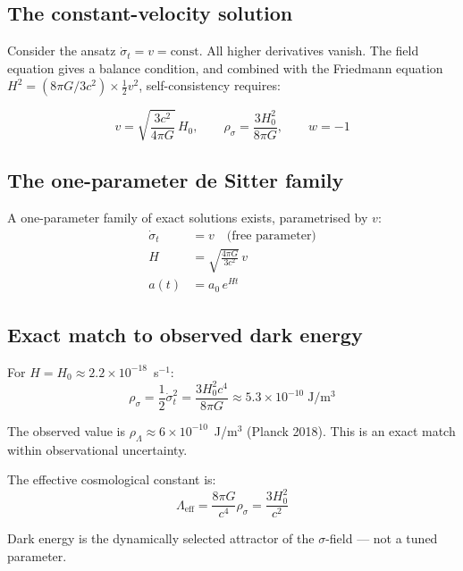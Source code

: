 \documentclass[11pt,a4paper]{article}
\theoremstyle{plain}
\theoremstyle{definition}
\theoremstyle{remark}
\begin{document}
\subsection{The constant-velocity solution}

Consider the ansatz $\dot\sigma_t = v = \mathrm{const}$.  All higher derivatives vanish.  The field equation gives a balance condition, and combined with the Friedmann equation $H^2 = (8\pi G/3c^2)\times\tfrac{1}{2}v^2$, self-consistency requires:

\begin{equation}
  \boxed{v = \sqrt{\frac{3c^2}{4\pi G}}\,H_0, \qquad \rho_\sigma = \frac{3H_0^2}{8\pi G}, \qquad w = -1}
  \label{eq:attractor}
\end{equation}

\subsection{The one-parameter de Sitter family}

A one-parameter family of exact solutions exists, parametrised by $v$:
\begin{align}
  \dot\sigma_t &= v \quad\text{(free parameter)} \\
  H &= \sqrt{\frac{4\pi G}{3c^2}}\,v \\
  a(t) &= a_0\,e^{Ht}
\end{align}

\subsection{Exact match to observed dark energy}

For $H = H_0 \approx 2.2\times10^{-18}$~s$^{-1}$:
\begin{equation}
  \rho_\sigma = \frac{1}{2}\dot\sigma_t^2 = \frac{3H_0^2 c^4}{8\pi G} \approx 5.3\times10^{-10}\;\mathrm{J/m^3}
\end{equation}

The observed value is $\rho_\Lambda \approx 6\times10^{-10}$~J/m$^3$ (Planck 2018).  This is an exact match within observational uncertainty.

The effective cosmological constant is:
\begin{equation}
  \Lambda_{\mathrm{eff}} = \frac{8\pi G}{c^4}\rho_\sigma = \frac{3H_0^2}{c^2}
\end{equation}

Dark energy is the dynamically selected attractor of the $\sigma$-field --- not a tuned parameter.
\end{document}
